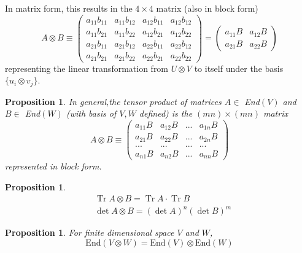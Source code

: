 \documentclass{article}
\DeclareMathOperator{\Tr}{Tr}
\newtheorem{proposition}[theorem]{Proposition}
\theoremstyle{remark}
\theoremstyle{definition}
\begin{document}
In matrix form, this results in the $4\times 4$ matrix (also in block form)
\[A \otimes B \equiv \begin{pmatrix}
a_{11} b_{11} & a_{11} b_{12} & a_{12} b_{11} & a_{12} b_{12} \\
a_{11} b_{21} & a_{11} b_{22} & a_{12} b_{21} & a_{12} b_{22} \\
a_{21} b_{11} & a_{21} b_{12} & a_{22} b_{11} & a_{22} b_{12} \\
a_{21} b_{21} & a_{21} b_{22} & a_{22} b_{21} & a_{22} b_{22} 
\end{pmatrix} = \begin{pmatrix}
a_{11} B & a_{12} B \\
a_{21} B & a_{22} B 
\end{pmatrix}\]
representing the linear transformation from $U \otimes V$ to itself under the basis $\{u_i \otimes v_j\}$. 
\begin{proposition}
In general,the tensor product of matrices $A \in $ End$(V)$ and $B \in $ End$(W)$ (with basis of $V, W$ defined) is the $(m n) \times (m n)$ matrix
\[A \otimes B \equiv \begin{pmatrix}
a_{11} B & a_{12} B & ... & a_{1n} B \\
a_{21} B & a_{22} B & ... & a_{2n} B \\
... & ... & ... & ... \\
a_{n1} B & a_{n2} B & ... & a_{nn} B 
\end{pmatrix}\]
represented in block form. 
\end{proposition}

\begin{proposition}
\begin{align*}
    & \Tr{A \otimes B} = \Tr{A} \cdot \Tr{B} \\
    & \det{A \otimes B} = (\det{A})^n (\det{B})^m
\end{align*}
\end{proposition}

\begin{proposition}
For finite dimensional space $V$ and $W$, 
\[\text{End}(V \otimes W) = \text{End}(V) \otimes \text{End}(W)\]
\end{proposition}
\end{document}
